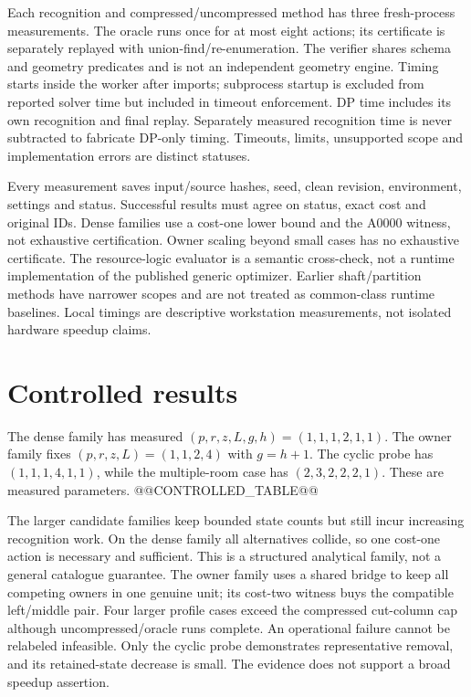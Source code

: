 \documentclass[10pt]{article}
\begin{document}
Each recognition and compressed/uncompressed method has three fresh-process measurements. The oracle runs once for at most eight actions; its certificate is separately replayed with union-find/re-enumeration. The verifier shares schema and geometry predicates and is not an independent geometry engine. Timing starts inside the worker after imports; subprocess startup is excluded from reported solver time but included in timeout enforcement. DP time includes its own recognition and final replay. Separately measured recognition time is never subtracted to fabricate DP-only timing. Timeouts, limits, unsupported scope and implementation errors are distinct statuses.

Every measurement saves input/source hashes, seed, clean revision, environment, settings and status. Successful results must agree on status, exact cost and original IDs. Dense families use a cost-one lower bound and the A0000 witness, not exhaustive certification. Owner scaling beyond small cases has no exhaustive certificate. The resource-logic evaluator is a semantic cross-check, not a runtime implementation of the published generic optimizer. Earlier shaft/partition methods have narrower scopes and are not treated as common-class runtime baselines. Local timings are descriptive workstation measurements, not isolated hardware speedup claims.

\section{Controlled results}
The dense family has measured $(p,r,z,L,g,h)=(1,1,1,2,1,1)$. The owner family fixes $(p,r,z,L)=(1,1,2,4)$ with $g=h+1$. The cyclic probe has $(1,1,1,4,1,1)$, while the multiple-room case has $(2,3,2,2,2,1)$. These are measured parameters.
@@CONTROLLED_TABLE@@

The larger candidate families keep bounded state counts but still incur increasing recognition work. On the dense family all alternatives collide, so one cost-one action is necessary and sufficient. This is a structured analytical family, not a general catalogue guarantee. The owner family uses a shared bridge to keep all competing owners in one genuine unit; its cost-two witness buys the compatible left/middle pair. Four larger profile cases exceed the compressed cut-column cap although uncompressed/oracle runs complete. An operational failure cannot be relabeled infeasible. Only the cyclic probe demonstrates representative removal, and its retained-state decrease is small. The evidence does not support a broad speedup assertion.
\end{document}

